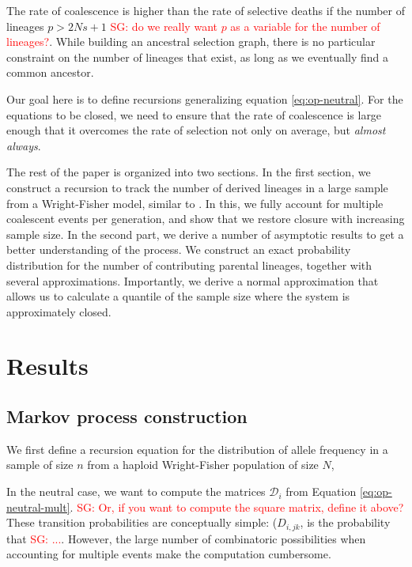 \documentclass[review]{elsarticle}
\newcommand{\ra}{\rightarrow}
\newcommand{\sgcomment}[1]{\textcolor{red}{SG: #1}}
\begin{document}
The rate of coalescence is higher than the rate of selective deaths if the number of lineages  $p>2Ns+1$ \sgcomment{do we really want $p$ as a variable for the number of lineages?}. While building an ancestral selection graph, there is no particular constraint on the number of lineages that exist, as long as we eventually find a common ancestor. 

Our goal here is to define recursions generalizing equation \eqref{eq:op-neutral}. For the equations to be closed, we need to ensure that the rate of coalescence is large enough that it overcomes the rate of selection not only on average, but \emph{almost always}. 

The rest of the paper is organized into two sections. In the first section, we construct a recursion to track the number of derived lineages in a large sample from a Wright-Fisher model,
similar to \cite{JouganousEtAl2017,KammEtAl2017}. In this, we fully account for multiple coalescent
events per generation, and show that we restore closure with increasing sample size. In the second
part, we derive a number of asymptotic results to get a better understanding of the process. We
construct an exact probability distribution for the number of contributing parental lineages,
together with several approximations. Importantly, we derive a normal approximation that allows us
to calculate a quantile of the sample size where the system is approximately closed.

\section{Results}
\label{sec:results}

\subsection{Markov process construction}
\label{subsec:markov}

We first define a recursion equation for the distribution of allele frequency in a sample of size $n$ from a haploid Wright-Fisher population of size $N$, 


In the neutral case, we want to compute the matrices $\mathcal{D}_i$ from Equation \eqref{eq:op-neutral-mult}. \sgcomment{Or, if you want to compute the square matrix, define it above?}
These transition probabilities are conceptually simple: ($D_{i,jk}$, is the probability that \sgcomment{...}. However, the large number of combinatoric possibilities when accounting for multiple events make the computation cumbersome.  
 
\end{document}
